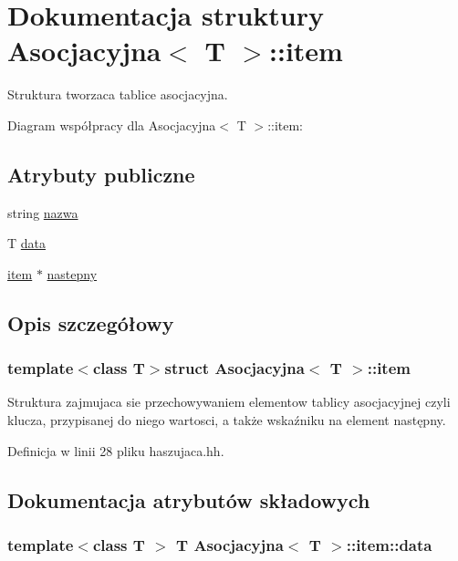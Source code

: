 \hypertarget{struct_asocjacyjna_1_1item}{\section{\-Dokumentacja struktury \-Asocjacyjna$<$ \-T $>$\-:\-:item}
\label{struct_asocjacyjna_1_1item}
}


\-Struktura tworzaca tablice asocjacyjna.  




\-Diagram współpracy dla \-Asocjacyjna$<$ \-T $>$\-:\-:item\-:
\subsection*{\-Atrybuty publiczne}
\begin{DoxyCompactItemize}
\item 
string \hyperlink{struct_asocjacyjna_1_1item_a08f14a8db9bfd74ac9666879ce502835}{nazwa}
\item 
\-T \hyperlink{struct_asocjacyjna_1_1item_a75e334c141874fc951cdfa168fa9bfb4}{data}
\item 
\hyperlink{struct_asocjacyjna_1_1item}{item} $\ast$ \hyperlink{struct_asocjacyjna_1_1item_a7031da0f74b513b793b4abb93af7d3c3}{nastepny}
\end{DoxyCompactItemize}


\subsection{\-Opis szczegółowy}
\subsubsection*{template$<$class T$>$struct Asocjacyjna$<$ T $>$\-::item}

\-Struktura zajmujaca sie przechowywaniem elementow tablicy asocjacyjnej czyli klucza, przypisanej do niego wartosci, a także wskaźniku na element następny. 

\-Definicja w linii 28 pliku haszujaca.\-hh.



\subsection{\-Dokumentacja atrybutów składowych}
\hypertarget{struct_asocjacyjna_1_1item_a75e334c141874fc951cdfa168fa9bfb4}{
\subsubsection[{data}]{\setlength{\rightskip}{0pt plus 5cm}template$<$class T $>$ \-T {\bf \-Asocjacyjna}$<$ \-T $>$\-::{\bf item\-::data}}}\label{struct_asocjacyjna_1_1item_a75e334c141874fc951cdfa168fa9bfb4}


